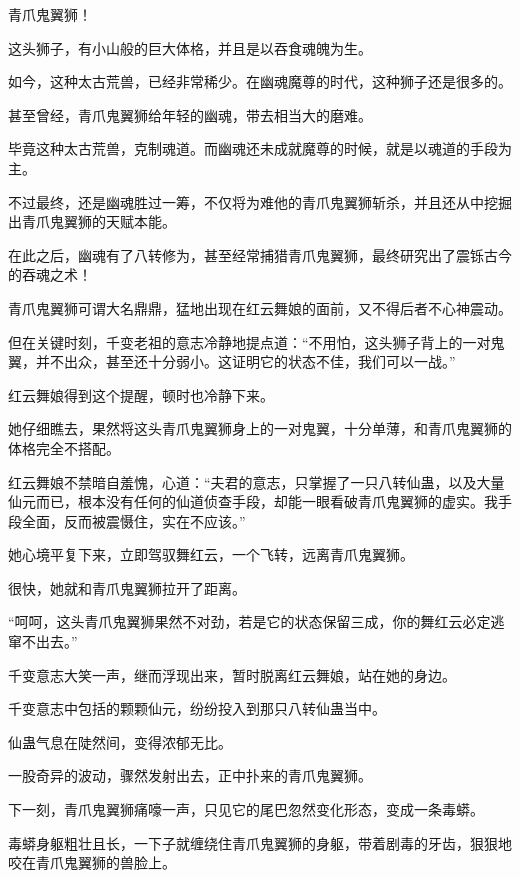 
\begin{this_body}

青爪鬼翼狮！

这头狮子，有小山般的巨大体格，并且是以吞食魂魄为生。

如今，这种太古荒兽，已经非常稀少。在幽魂魔尊的时代，这种狮子还是很多的。

甚至曾经，青爪鬼翼狮给年轻的幽魂，带去相当大的磨难。

毕竟这种太古荒兽，克制魂道。而幽魂还未成就魔尊的时候，就是以魂道的手段为主。

不过最终，还是幽魂胜过一筹，不仅将为难他的青爪鬼翼狮斩杀，并且还从中挖掘出青爪鬼翼狮的天赋本能。

在此之后，幽魂有了八转修为，甚至经常捕猎青爪鬼翼狮，最终研究出了震铄古今的吞魂之术！

青爪鬼翼狮可谓大名鼎鼎，猛地出现在红云舞娘的面前，又不得后者不心神震动。

但在关键时刻，千变老祖的意志冷静地提点道：“不用怕，这头狮子背上的一对鬼翼，并不出众，甚至还十分弱小。这证明它的状态不佳，我们可以一战。”

红云舞娘得到这个提醒，顿时也冷静下来。

她仔细瞧去，果然将这头青爪鬼翼狮身上的一对鬼翼，十分单薄，和青爪鬼翼狮的体格完全不搭配。

红云舞娘不禁暗自羞愧，心道：“夫君的意志，只掌握了一只八转仙蛊，以及大量仙元而已，根本没有任何的仙道侦查手段，却能一眼看破青爪鬼翼狮的虚实。我手段全面，反而被震慑住，实在不应该。”

她心境平复下来，立即驾驭舞红云，一个飞转，远离青爪鬼翼狮。

很快，她就和青爪鬼翼狮拉开了距离。

“呵呵，这头青爪鬼翼狮果然不对劲，若是它的状态保留三成，你的舞红云必定逃窜不出去。”

千变意志大笑一声，继而浮现出来，暂时脱离红云舞娘，站在她的身边。

千变意志中包括的颗颗仙元，纷纷投入到那只八转仙蛊当中。

仙蛊气息在陡然间，变得浓郁无比。

一股奇异的波动，骤然发射出去，正中扑来的青爪鬼翼狮。

下一刻，青爪鬼翼狮痛嚎一声，只见它的尾巴忽然变化形态，变成一条毒蟒。

毒蟒身躯粗壮且长，一下子就缠绕住青爪鬼翼狮的身躯，带着剧毒的牙齿，狠狠地咬在青爪鬼翼狮的兽脸上。


\end{this_body}
